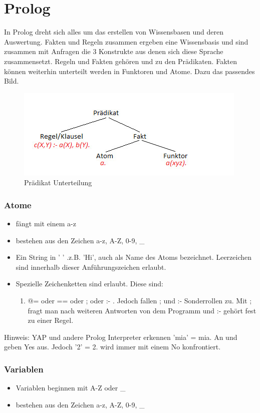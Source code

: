 \chapter{Prolog}
\label{sec:Prolog}
In Prolog dreht sich alles um das erstellen von Wissensbasen und deren Auswertung. Fakten und Regeln zusammen ergeben eine Wissensbasis und sind zusammen mit Anfragen die 3 Konstrukte aus denen sich diese Sprache zusammensetzt. Regeln und Fakten gehören und zu den Prädikaten. Fakten können weiterhin unterteilt werden in Funktoren und Atome. Dazu das passendes Bild. 

\begin{figure}[h]
\centering
\includegraphics[width=0.5\linewidth]{mainmatter/pics/Prolog}
\caption[Prädikat Unterteilung]{Prädikat Unterteilung}
\label{fig:Prolog}
\end{figure}

\subsection{Atome}
\begin{itemize}
	\item fängt mit einem a-z
	\item bestehen aus den Zeichen a-z, A-Z, 0-9, \_
	\item Ein String in ' ' .z.B. 'Hi', auch als Name des Atoms bezeichnet. Leerzeichen sind innerhalb dieser Anführungszeichen erlaubt.
	\item Spezielle Zeichenketten sind erlaubt. Diese sind:
	\begin{enumerate}
		\item @= oder == oder ; oder :-  . Jedoch fallen ; und :- Sonderrollen zu. Mit ; fragt man nach weiteren Antworten von dem Programm und :- gehört fest zu einer Regel.
	\end{enumerate}
\end{itemize}
Hinweis: YAP und andere Prolog Interpreter erkennen 'mia' = mia. An und geben Yes aus. Jedoch '2' = 2. wird immer mit einem No konfrontiert. 
\subsection{Variablen}
\begin{itemize}
	\item Variablen beginnen mit A-Z oder \_ 
	\item bestehen aus den Zeichen a-z, A-Z, 0-9, \_
\end{itemize}
